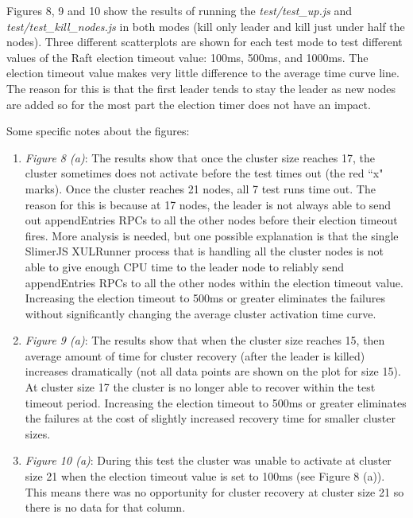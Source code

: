 \documentclass[9pt]{extarticle}
\begin{document}
\begin{multicols}{2}
Figures 8, 9 and 10 show the results of running the
\emph{test/test\_up.js} and \emph{test/test\_kill\_nodes.js} in both
modes (kill only leader and kill just under half the nodes). Three
different scatterplots are shown for each test mode to test different
values of the Raft election timeout value: 100ms, 500ms, and 1000ms.
The election timeout value makes very little difference to the average
time curve line. The reason for this is that the first leader tends to
stay the leader as new nodes are added so for the most part the
election timer does not have an impact.

Some specific notes about the figures:


\begin{enumerate}
    \item \emph{Figure 8 (a)}: The results show that once the cluster
        size reaches 17, the cluster sometimes does not activate
        before the test times out (the red ``x" marks). Once the
        cluster reaches 21 nodes, all 7 test runs time out. The reason
        for this is because at 17 nodes, the leader is not always able
        to send out appendEntries RPCs to all the other nodes before
        their election timeout fires. More analysis is needed, but one
        possible explanation is that the single SlimerJS XULRunner
        process that is handling all the cluster nodes is not able to
        give enough CPU time to the leader node to reliably send
        appendEntries RPCs to all the other nodes within the election
        timeout value. Increasing the election timeout to 500ms or
        greater eliminates the failures without significantly changing
        the average cluster activation time curve.
    \item \emph{Figure 9 (a)}: The results show that when the cluster
        size reaches 15, then average amount of time for cluster
        recovery (after the leader is killed) increases dramatically
        (not all data points are shown on the plot for size 15). At
        cluster size 17 the cluster is no longer able to recover
        within the test timeout period. Increasing the election
        timeout to 500ms or greater eliminates the failures at the
        cost of slightly increased recovery time for smaller cluster
        sizes.
    \item \emph{Figure 10 (a)}: During this test the cluster was unable to
        activate at cluster size 21 when the election timeout value is
        set to 100ms (see Figure 8 (a)). This means there was no
        opportunity for cluster recovery at cluster size 21 so there
        is no data for that column.


\end{enumerate}
\end{multicols}
\end{document}
